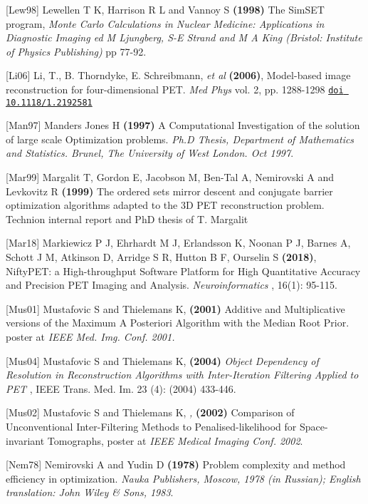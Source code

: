 \documentclass{article}
\def\url#1#2{\mbox{\href{#1}{\tt #2}}}
\begin{document}
{{{[}Lew98] Lewellen T K, Harrison R L and Vannoy S \textbf{(1998)} 
The SimSET program,
\textit{ Monte Carlo Calculations in Nuclear Medicine:
Applications in Diagnostic Imaging ed M Ljungberg, S-E Strand and M A King (Bristol: Institute of Physics
Publishing)} pp 77-92.

[Li06] Li, T., B. Thorndyke, E.
Schreibmann, \textit{et al} \textbf{(2006)}, Model-based image reconstruction for
four-dimensional PET. \textit{Med Phys} vol. 2, pp. 1288-1298
\url{http://link.aip.org/link/doi/10.1118/1.2192581}{doi 10.1118/1.2192581}

{[}Man97] Manders Jones H \textbf{(1997)} A Computational Investigation 
of the solution of large scale Optimization problems. \textit{Ph.D 
Thesis, Department of Mathematics and Statistics. Brunel, The 
University of West London. Oct 1997}.


{[}Mar99] Margalit T, Gordon E, Jacobson M, Ben-Tal A, Nemirovski 
A and Levkovitz R \textbf{(1999)} The ordered sets mirror descent and 
conjugate barrier optimization algorithms adapted to the 3D PET 
reconstruction problem. Technion internal report and PhD thesis of T. Margalit

[Mar18] Markiewicz P J, Ehrhardt M J, Erlandsson K, Noonan P J, Barnes A, Schott J M, 
Atkinson D, Arridge S R, Hutton B F, Ourselin S \textbf{(2018)}, 
NiftyPET: a High-throughput Software Platform for High 
Quantitative Accuracy and Precision PET Imaging and Analysis.
\textit { Neuroinformatics }, 16(1): 95-115.

{[}Mus01] Mustafovic S and Thielemans K, \textbf{(2001)} Additive and Multiplicative 
versions of the Maximum A Posteriori Algorithm with the Median 
Root Prior. poster at \textit{IEEE Med. Img. Conf. 2001.}

{[}Mus04] Mustafovic S and Thielemans K, \textbf{(200}\textbf{4}\textbf{)} \textit{Object 
Dependency of Resolution in Reconstruction Algorithms with Inter-Iteration 
Filtering Applied to PET} , IEEE Trans. Med. Im. 23 (4): (2004) 
433-446.

{[}Mus02] Mustafovic S and Thielemans K, \textit{,} \textbf{(2002)}  Comparison 
of Unconventional Inter-Filtering Methods to Penalised-likelihood 
for Space-invariant Tomographs, poster at \textit{IEEE Medical Imaging 
Conf. 2002}.

{[}Nem78] Nemirovski A and Yudin D \textbf{(1978)} Problem complexity 
and method efficiency in optimization. \textit{Nauka Publishers, 
Moscow, 1978 (in Russian); English translation: John Wiley \& 
Sons, 1983}.

}}
\end{document}
